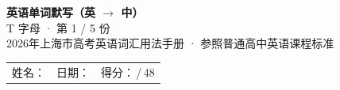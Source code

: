 \documentclass[10pt,a4paper]{article}
\begin{document}
\pagestyle{plain}

\begin{center}
{\LARGE\bfseries 英语单词默写（英 $\to$ 中）}\\[0.22em]
{\large T 字母 · 第 1 / 5 份}\\[0.18em]
{\small 2026年上海市高考英语词汇用法手册 · 参照普通高中英语课程标准}
\end{center}

\vspace{0.25em}
\noindent\begin{tabular}{@{}p{}@{}p{}@{}p{}@{}}
姓名：\underline{\hspace{2.0cm}} & 日期：\underline{\hspace{2.0cm}} & 得分：\underline{\hspace{1.3cm}}\,/\,48 \\
\end{tabular}

\vspace{0.3em}

\vspace{0.08em}
\end{document}
